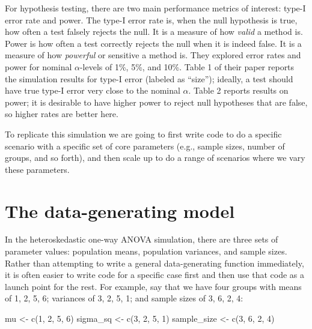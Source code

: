 \documentclass[
]{book}
\newenvironment{Shaded}{\begin{snugshade}}{\end{snugshade}}
\newcommand{\DecValTok}[1]{\textcolor[rgb]{0.00,0.00,0.81}{#1}}
\newcommand{\FunctionTok}[1]{\textcolor[rgb]{0.00,0.00,0.00}{#1}}
\newcommand{\NormalTok}[1]{#1}
\newcommand{\OtherTok}[1]{\textcolor[rgb]{0.56,0.35,0.01}{#1}}
\begin{document}
For hypothesis testing, there are two main performance metrics of interest: type-I error rate and power.
The type-I error rate is, when the null hypothesis is true, how often a test falsely rejects the null.
It is a measure of how \emph{valid} a method is.
Power is how often a test correctly rejects the null when it is indeed false.
It is a measure of how \emph{powerful} or sensitive a method is.
They explored error rates and power for nominal \(\alpha\)-levels of 1\%, 5\%, and 10\%.
Table 1 of their paper reports the simulation results for type-I error (labeled as ``size''); ideally, a test should have true type-I error very close to the nominal \(\alpha\).
Table 2 reports results on power; it is desirable to have higher power to reject null hypotheses that are false, so higher rates are better here.

To replicate this simulation we are going to first write code to do a specific scenario with a specific set of core parameters (e.g., sample sizes, number of groups, and so forth), and then scale up to do a range of scenarios where we vary these parameters.

\hypertarget{the-data-generating-model}{%
\section{The data-generating model}\label{the-data-generating-model}}

In the heteroskedastic one-way ANOVA simulation, there are three sets of parameter values: population means, population variances, and sample sizes.
Rather than attempting to write a general data-generating function immediately, it is often easier to write code for a specific case first and then use that code as a launch point for the rest.
For example, say that we have four groups with means of 1, 2, 5, 6; variances of 3, 2, 5, 1; and sample sizes of 3, 6, 2, 4:

\begin{Shaded}
\begin{Highlighting}[]
\NormalTok{mu }\OtherTok{\textless{}{-}} \FunctionTok{c}\NormalTok{(}\DecValTok{1}\NormalTok{, }\DecValTok{2}\NormalTok{, }\DecValTok{5}\NormalTok{, }\DecValTok{6}\NormalTok{)}
\NormalTok{sigma\_sq }\OtherTok{\textless{}{-}} \FunctionTok{c}\NormalTok{(}\DecValTok{3}\NormalTok{, }\DecValTok{2}\NormalTok{, }\DecValTok{5}\NormalTok{, }\DecValTok{1}\NormalTok{)}
\NormalTok{sample\_size }\OtherTok{\textless{}{-}} \FunctionTok{c}\NormalTok{(}\DecValTok{3}\NormalTok{, }\DecValTok{6}\NormalTok{, }\DecValTok{2}\NormalTok{, }\DecValTok{4}\NormalTok{)}
\end{Highlighting}
\end{Shaded}
\end{document}
